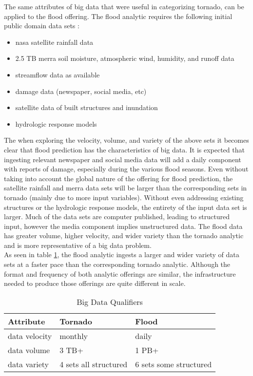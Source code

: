 The same attributes of big data that were useful in categorizing tornado, can be applied to the flood offering. The flood analytic requires the following initial public domain data sets \cite{walker}:
\begin{itemize}
    \item \gls{nasa} satellite rainfall data
    \item 2.5 TB \gls{merra} soil moisture, atmospheric wind, humidity, and runoff data
    \item streamflow data as available
    \item damage data (newspaper, social media, etc)
    \item satellite data of built structures and inundation
    \item hydrologic response models
\end{itemize}
The when exploring the velocity, volume, and variety of the above sets it becomes clear that flood prediction has the characteristics of big data. It is expected that ingesting relevant newspaper and social media data will add a daily component with reports of damage, especially during the various flood seasons. Even without taking into account the global nature of the offering for flood prediction, the satellite rainfall and \gls{merra} data sets will be larger than the corresponding sets in tornado (mainly due to more input variables). Without even addressing existing structures or the hydrologic response models, the entirety of the input data set is larger. Much of the data sets are computer published, leading to structured input, however the media component implies unstructured data. The flood data has greater volume, higher velocity, and wider variety than the tornado analytic and is more representative of a big data problem.\\

As seen in table \ref{qualifiers}, the flood analytic ingests a larger and wider variety of data sets at a faster pace than the corresponding tornado analytic. Although the format and frequency of both analytic offerings are similar, the infrastructure needed to produce those offerings are quite different in scale.
\begin{table}[htbp]
    \centering
    \begin{tabular}{l l l}
        \hline
        Attribute & Tornado & Flood\\ [0.5ex]
        \hline
        data velocity & monthly & daily\\
        data volume &  3 TB+  & 1 PB+\\
        data variety &  4 sets all structured & 6 sets some structured\\
        \hline
    \end{tabular}
    \caption{Big Data Qualifiers}
    \label{qualifiers}
\end{table}
